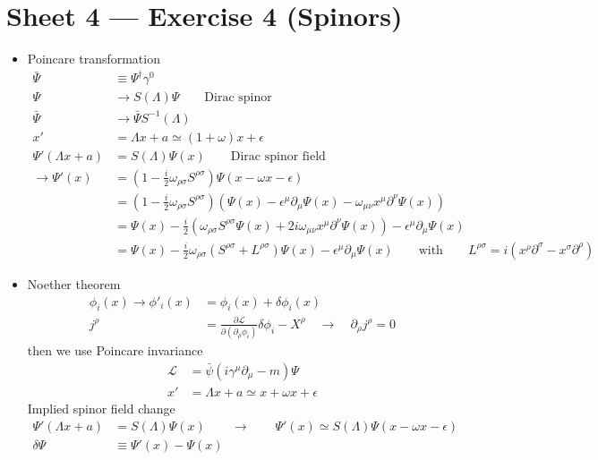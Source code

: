 \documentclass[10pt,a4paper]{report}
\theoremstyle{definition}
\begin{document}
\section{Sheet 4 — Exercise 4 (Spinors)}
\begin{itemize}
\item Poincare transformation
\begin{align}
\bar{\Psi}&\equiv\Psi^\dagger\gamma^0\\
\Psi&\rightarrow S(\Lambda)\Psi\qquad\text{Dirac spinor}\\
\bar{\Psi}&\rightarrow \bar{\Psi}S^{-1}(\Lambda)\\
x'&=\Lambda x+a\simeq (1+\omega)x+\epsilon\\
\Psi'(\Lambda x+a)
&=S(\Lambda)\Psi(x)\qquad\text{Dirac spinor field}\\
\rightarrow \Psi'(x)
&=\left(1-\frac{i}{2}\omega_{\rho\sigma} S^{\rho\sigma}\right)\Psi(x-\omega x-\epsilon)\\
&=\left(1-\frac{i}{2}\omega_{\rho\sigma} S^{\rho\sigma}\right)\left(\Psi(x)-\epsilon^\mu\partial_\mu\Psi(x)-\omega_{\mu\nu} x^\mu\partial^\nu\Psi(x)\right)\\
&=\Psi(x)-\frac{i}{2}\left(\omega_{\rho\sigma} S^{\rho\sigma}\Psi(x)+2i\omega_{\mu\nu}x^\mu\partial^\nu\Psi(x)\right)-\epsilon^\mu\partial_\mu\Psi(x)\\
&=\Psi(x)-\frac{i}{2}\omega_{\rho\sigma}\left(S^{\rho\sigma}+L^{\rho\sigma}\right)\Psi(x)-\epsilon^\mu\partial_\mu\Psi(x)\qquad\text{with}\qquad L^{\rho\sigma}=i(x^\rho\partial^\sigma-x^\sigma\partial^\rho)
\end{align}
\item Noether theorem
\begin{align}
\phi_i(x)\rightarrow\phi'_i(x)
&=\phi_i(x)+\delta\phi_i(x)\\
j^\rho
&=\frac{\partial\mathcal{L}}{\partial(\partial_\rho\phi_i)}\delta\phi_i-X^\rho
\quad\rightarrow\quad
\partial_\rho j^\rho=0
\end{align}
then we use Poincare invariance
\begin{align}
\mathcal{L}&=\bar{\psi}(i\gamma^\mu\partial_\mu-m)\Psi\\
x'&=\Lambda x+a\simeq x+\omega x+\epsilon
\end{align}
Implied spinor field change
\begin{align}
\Psi'(\Lambda x+a)&=S(\Lambda)\Psi(x)\qquad\rightarrow\qquad\Psi'(x)\simeq S(\Lambda)\Psi(x-\omega x-\epsilon)\\
\delta\Psi
&\equiv\Psi'(x)-\Psi(x)\\

\end{align}
\end{itemize}
\end{document}

